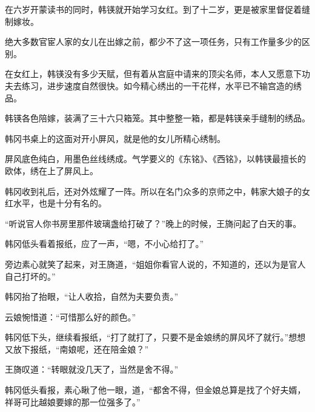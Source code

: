 在六岁开蒙读书的同时，韩锳就开始学习女红。到了十二岁，更是被家里督促着缝制嫁妆。

绝大多数官宦人家的女儿在出嫁之前，都少不了这一项任务，只有工作量多少的区别。

在女红上，韩锳没有多少天赋，但有着从宫庭中请来的顶尖名师，本人又愿意下功夫去练习，进步速度自然很快。如今精心绣出的一干花样，水平已不输宫造的绣品。

韩锳各色陪嫁，装满了三十六只箱笼。其中整整一箱，都是韩锳亲手缝制的绣品。

韩冈书桌上的这面对开小屏风，就是他的女儿所精心绣制。

屏风底色纯白，用墨色丝线绣成。气学要义的《东铭》、《西铭》，以韩锳最擅长的欧体，绣在上了屏风上。

韩冈收到礼后，还对外炫耀了一阵。所以在名门众多的京师之中，韩家大娘子的女红水平，也是十分有名的。

“听说官人你书房里那件玻璃盏给打破了？”晚上的时候，王旖问起了白天的事。

韩冈低头看着报纸，应了一声，“嗯，不小心给打了。”

旁边素心就笑了起来，对王旖道，“姐姐你看官人说的，不知道的，还以为是官人自己打坏的。”

韩冈抬了抬眼，“让人收拾，自然为夫要负责。”

云娘惋惜道：“可惜那么好的颜色。”

韩冈低下头，继续看报纸，“打了就打了，只要不是金娘绣的屏风坏了就行。”想想又放下报纸，“南娘呢，还在陪金娘？”

王旖叹道：“转眼就没几天了，当然是舍不得。”

韩冈低头看报，素心瞅了他一眼，道，“都舍不得，但金娘总算是找了个好夫婿，祥哥可比越娘要嫁的那一位强多了。”